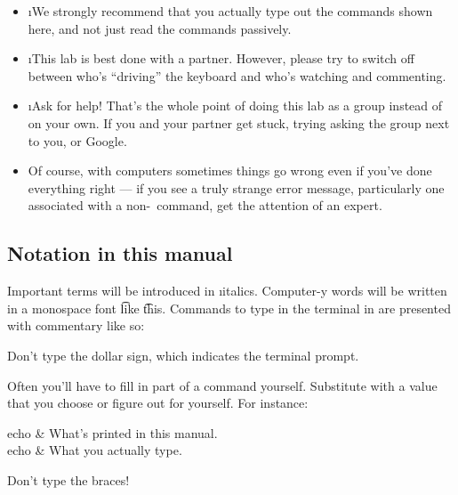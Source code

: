 \documentclass[letterpaper, 12pt, titlepage, twoside]{article}
\begin{document}
\begin{itemize}
\item \i{We strongly recommend that you actually type out the commands shown
  here}, \x and not just read the commands passively.

\item \i{This lab is best done with a partner.} However, please try to switch
  off between who's ``driving'' the keyboard and who's watching and
  commenting.

\item \i{Ask for help!} That's the whole point of doing this lab as a group
  instead of on your own. If you and your partner get stuck, trying asking the
  group next to you, or Google.

\item Of course, with computers sometimes things go wrong even if you've done
  everything right --- if you see a truly strange error message, particularly
  one associated with a non-\git\ command, get the attention of an expert.
\end{itemize}

\subsection*{Notation in this manual}

Important terms will be introduced in \i{italics}. Computer-y words will be
written in a monospace font \t{like} \t{this}. Commands to type in the
terminal in are presented with commentary like so:


Don't type the dollar sign, which indicates the terminal prompt.

Often you'll have to fill in part of a command yourself. Substitute  with a value that you choose or figure out for yourself. For instance:

\nopagebreak

\begin{typeme}
echo  & What's printed in this manual. \\
echo \the\year & What you actually type.
\end{typeme}

Don't type the braces!

\end{document}
